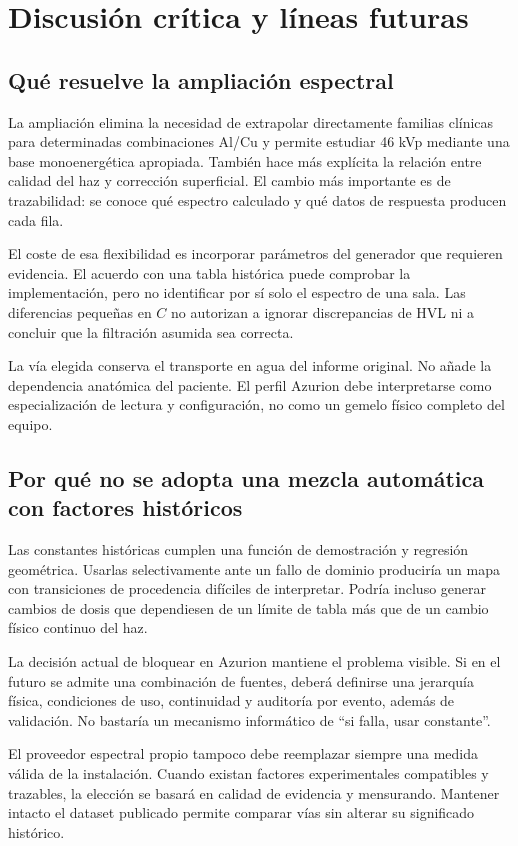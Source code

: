 \chapter{Discusión crítica y líneas futuras}
\section{Qué resuelve la ampliación espectral}
La ampliación elimina la necesidad de extrapolar directamente familias clínicas para determinadas combinaciones Al/Cu y permite estudiar 46 kVp mediante una base monoenergética apropiada. También hace más explícita la relación entre calidad del haz y corrección superficial. El cambio más importante es de trazabilidad: se conoce qué espectro calculado y qué datos de respuesta producen cada fila.

El coste de esa flexibilidad es incorporar parámetros del generador que requieren evidencia. El acuerdo con una tabla histórica puede comprobar la implementación, pero no identificar por sí solo el espectro de una sala. Las diferencias pequeñas en $C$ no autorizan a ignorar discrepancias de HVL ni a concluir que la filtración asumida sea correcta.

La vía elegida conserva el transporte en agua del informe original. No añade la dependencia anatómica del paciente. El perfil Azurion debe interpretarse como especialización de lectura y configuración, no como un gemelo físico completo del equipo.

\section{Por qué no se adopta una mezcla automática con factores históricos}
Las constantes históricas cumplen una función de demostración y regresión geométrica. Usarlas selectivamente ante un fallo de dominio produciría un mapa con transiciones de procedencia difíciles de interpretar. Podría incluso generar cambios de dosis que dependiesen de un límite de tabla más que de un cambio físico continuo del haz.

La decisión actual de bloquear en Azurion mantiene el problema visible. Si en el futuro se admite una combinación de fuentes, deberá definirse una jerarquía física, condiciones de uso, continuidad y auditoría por evento, además de validación. No bastaría un mecanismo informático de ``si falla, usar constante''.

El proveedor espectral propio tampoco debe reemplazar siempre una medida válida de la instalación. Cuando existan factores experimentales compatibles y trazables, la elección se basará en calidad de evidencia y mensurando. Mantener intacto el dataset publicado permite comparar vías sin alterar su significado histórico.

